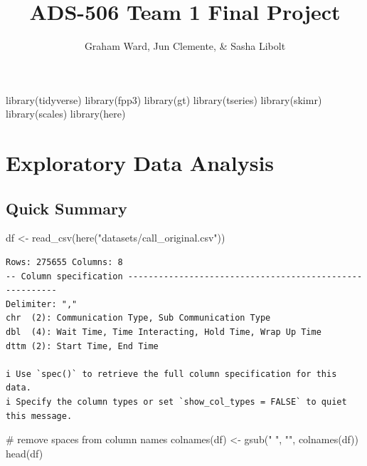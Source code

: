 \documentclass[
  letterpaper,
  DIV=11,
  numbers=noendperiod]{scrartcl}
\title{ADS-506 Team 1 Final Project}
\author{Graham Ward, Jun Clemente, \& Sasha Libolt}
\date{}
\newenvironment{Shaded}{\begin{snugshade}}{\end{snugshade}}
\newcommand{\CommentTok}[1]{\textcolor[rgb]{0.37,0.37,0.37}{#1}}
\newcommand{\FunctionTok}[1]{\textcolor[rgb]{0.28,0.35,0.67}{#1}}
\newcommand{\NormalTok}[1]{\textcolor[rgb]{0.00,0.23,0.31}{#1}}
\newcommand{\OtherTok}[1]{\textcolor[rgb]{0.00,0.23,0.31}{#1}}
\newcommand{\StringTok}[1]{\textcolor[rgb]{0.13,0.47,0.30}{#1}}
\begin{document}
\maketitle


\begin{Shaded}
\begin{Highlighting}[]
\FunctionTok{library}\NormalTok{(tidyverse)}
\FunctionTok{library}\NormalTok{(fpp3)}
\FunctionTok{library}\NormalTok{(gt)}
\FunctionTok{library}\NormalTok{(tseries)}
\FunctionTok{library}\NormalTok{(skimr)}
\FunctionTok{library}\NormalTok{(scales)}
\FunctionTok{library}\NormalTok{(here)}
\end{Highlighting}
\end{Shaded}

\section{Exploratory Data Analysis}\label{exploratory-data-analysis}

\subsection{Quick Summary}\label{quick-summary}

\begin{Shaded}
\begin{Highlighting}[]
\NormalTok{df }\OtherTok{\textless{}{-}} \FunctionTok{read\_csv}\NormalTok{(}\FunctionTok{here}\NormalTok{(}\StringTok{"datasets/call\_original.csv"}\NormalTok{))}
\end{Highlighting}
\end{Shaded}

\begin{verbatim}
Rows: 275655 Columns: 8
-- Column specification --------------------------------------------------------
Delimiter: ","
chr  (2): Communication Type, Sub Communication Type
dbl  (4): Wait Time, Time Interacting, Hold Time, Wrap Up Time
dttm (2): Start Time, End Time

i Use `spec()` to retrieve the full column specification for this data.
i Specify the column types or set `show_col_types = FALSE` to quiet this message.
\end{verbatim}

\begin{Shaded}
\begin{Highlighting}[]
\CommentTok{\# remove spaces from column names}
\FunctionTok{colnames}\NormalTok{(df) }\OtherTok{\textless{}{-}} \FunctionTok{gsub}\NormalTok{(}\StringTok{" "}\NormalTok{, }\StringTok{""}\NormalTok{, }\FunctionTok{colnames}\NormalTok{(df))}
\FunctionTok{head}\NormalTok{(df)}
\end{Highlighting}
\end{Shaded}
\end{document}
